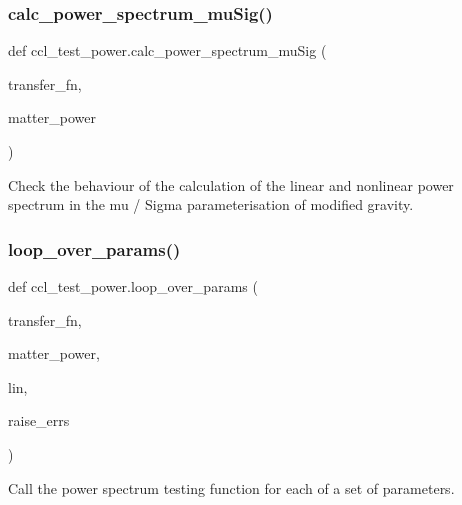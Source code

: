 \subsubsection{\texorpdfstring{calc\+\_\+power\+\_\+spectrum\+\_\+mu\+Sig()}{calc\_power\_spectrum\_muSig()}}
{\footnotesize\ttfamily def ccl\+\_\+test\+\_\+power.\+calc\+\_\+power\+\_\+spectrum\+\_\+mu\+Sig (\begin{DoxyParamCaption}\item[{}]{transfer\+\_\+fn,  }\item[{}]{matter\+\_\+power }\end{DoxyParamCaption})}

\begin{DoxyVerb}Check the behaviour of the calculation of the linear and 
nonlinear power spectrum in the mu / Sigma parameterisation of
modified gravity. \end{DoxyVerb}
 \mbox{\label{namespaceccl__test__power_a6a72c958a22a41eee6524ff79a2c68b1}} 
\subsubsection{\texorpdfstring{loop\+\_\+over\+\_\+params()}{loop\_over\_params()}}
{\footnotesize\ttfamily def ccl\+\_\+test\+\_\+power.\+loop\+\_\+over\+\_\+params (\begin{DoxyParamCaption}\item[{}]{transfer\+\_\+fn,  }\item[{}]{matter\+\_\+power,  }\item[{}]{lin,  }\item[{}]{raise\+\_\+errs }\end{DoxyParamCaption})}

\begin{DoxyVerb}Call the power spectrum testing function for each of a set of parameters.
\end{DoxyVerb}
 \mbox{\label{namespaceccl__test__power_a649d531f4ceee50a6345fcb2fa05e3f1}} 

